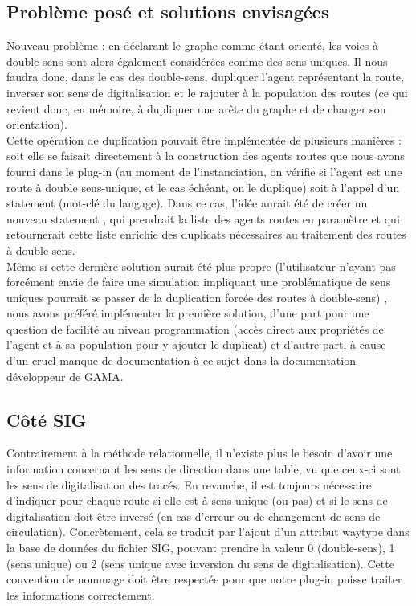 \documentclass[11pt]{report} %
\begin{document}
\subsection{Probl\`eme pos\'e et solutions envisag\'ees}
Nouveau probl\`eme : en d\'eclarant le graphe comme \'etant orient\'e, les voies \`a double sens sont alors \'egalement consid\'er\'ees comme des sens uniques. Il nous faudra donc, dans le cas des double-sens, dupliquer l'agent repr\'esentant la route, inverser son sens de digitalisation et le rajouter \`a la population des routes (ce qui revient donc, en m\'emoire, \`a dupliquer une ar\^ete du graphe et de changer son orientation).\\
Cette op\'eration de duplication pouvait \^etre impl\'ement\'ee de plusieurs mani\`eres : soit elle se faisait directement \`a la construction des agents routes que nous avons fourni dans le plug-in (au moment de l'instanciation, on v\'erifie si l'agent est une route \`a double sens-unique, et le cas \'ech\'eant, on le duplique) soit \`a l'appel d'un \og statement \fg{} (mot-cl\'e du langage). Dans ce cas, l'id\'ee aurait \'et\'e de cr\'eer un nouveau \og statement \fg{}, qui prendrait la liste des agents routes en param\`etre et qui retournerait cette liste enrichie des duplicats n\'ecessaires au traitement des routes \`a double-sens.\\
M\^eme si cette derni\`ere solution aurait \'et\'e plus propre (l'utilisateur n'ayant pas forc\'ement envie de faire une simulation impliquant une probl\'ematique de sens uniques pourrait se passer de la duplication forc\'ee des routes \`a double-sens) , nous avons pr\'ef\'er\'e impl\'ementer la premi\`ere solution, d'une part pour une question de facilit\'e au niveau programmation (acc\`es direct aux propri\'et\'es de l'agent et \`a sa population pour y ajouter le duplicat) et d'autre part, \`a cause d'un cruel manque de documentation \`a ce sujet dans la documentation d\'eveloppeur de GAMA. 

\subsection{Côt\'e SIG}
Contrairement \`a la m\'ethode relationnelle, il n'existe plus le besoin d'avoir une information concernant les sens de direction dans une table, vu que ceux-ci sont les sens de digitalisation des trac\'es. En revanche, il est toujours n\'ecessaire d'indiquer pour chaque route si elle est \`a sens-unique (ou pas) et si le sens de digitalisation doit \^etre invers\'e (en cas d'erreur ou de changement de sens de circulation). Concr\`etement, cela se traduit par l'ajout d'un attribut \og waytype \fg{} dans la base de donn\'ees du fichier SIG, pouvant prendre la valeur 0 (double-sens), 1 (sens unique)  ou 2 (sens unique avec inversion du sens de digitalisation). Cette convention de nommage doit \^etre respect\'ee pour que notre plug-in puisse traiter les informations correctement.
\end{document}
